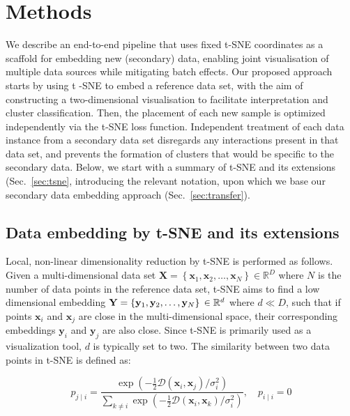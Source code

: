 \documentclass[runningheads]{llncs}
\begin{document}
\section{Methods}

We describe an end-to-end pipeline that uses fixed t-SNE coordinates as a scaffold for
embedding new (secondary) data, enabling joint visualisation of multiple data sources
while mitigating batch effects. Our proposed approach starts by using t\nobreakdash
-SNE to embed a reference data set, with the aim of constructing a
two-dimensional visualisation to facilitate interpretation and cluster
classification. Then, the placement of each new sample is
optimized independently via the
t\nobreakdash -SNE loss function. Independent treatment of each data instance from
a secondary data set disregards any interactions present in that data set, and
prevents the formation of clusters that would be specific to the secondary data. Below, we start
with a summary of t-SNE and its extensions (Sec.~\ref{sec:tsne}, introducing
the relevant notation, upon which we base our secondary data embedding
approach (Sec.~\ref{sec:transfer}).


\subsection{Data embedding by t-SNE and its extensions\label{sec:tsne}}

Local, non-linear dimensionality reduction by t-SNE is performed as follows.
Given a multi-dimensional data set $\mathbf{X} =
\left \{ \mathbf{x}_1, \mathbf{x}_2, \dots, \mathbf{x}_N \right \} \in
\mathbb{R}^D$ where $N$ is the number of data points in the reference data set,
t-SNE aims to find a low dimensional embedding $\mathbf{Y} = \left \{
\mathbf{y}_1, \mathbf{y}_2, \dots, \mathbf{y}_N \right \} \\\in \mathbb{R}^d$
where $d \ll D$, such that if points $\mathbf{x}_i$ and $\mathbf{x}_j$ are
close in the multi-dimensional space, their corresponding embeddings
$\mathbf{y}_i$ and $\mathbf{y}_j$ are also close. Since t-SNE is primarily used
as a visualization tool, $d$ is typically set to two. The similarity between
two data points in t-SNE is defined as:

\begin{equation}
p_{j \mid i} = \frac{\exp \left ( -\frac{1}{2} \mathcal{D}(\mathbf{x}_i, \mathbf{x}_j ) / \sigma_i^2 \right )}
{\sum_{k \neq i } \exp \left ( -\frac{1}{2} \mathcal{D}(\mathbf{x}_i, \mathbf{x}_k ) / \sigma_i^2 \right )}, \quad p_{i \mid i} = 0
\label{eq:gaussian_kernel}
\end{equation}
\end{document}
